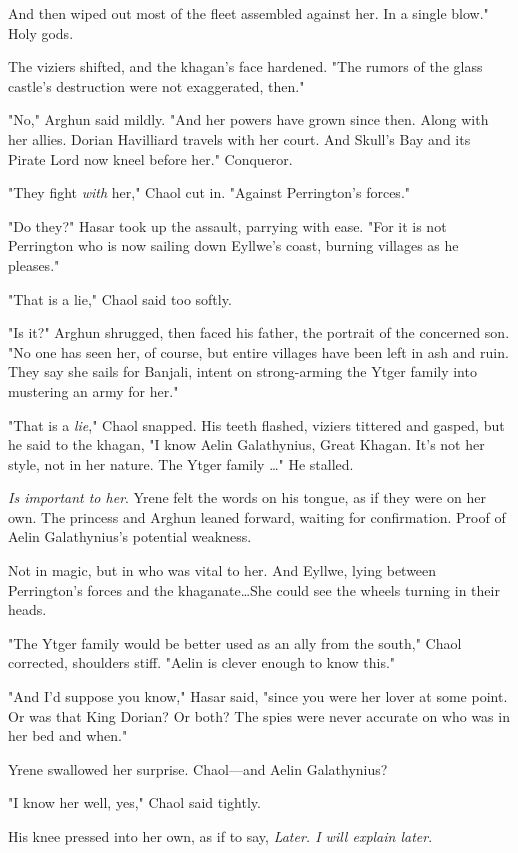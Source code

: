 And then wiped out most of the fleet assembled against her.
In a single blow."
Holy gods.

The viziers shifted, and the khagan's face hardened.
"The rumors of the glass castle's destruction were not exaggerated, then."

"No," Arghun said mildly.
"And her powers have grown since then.
Along with her allies.
Dorian Havilliard travels with her court.
And Skull's Bay and its Pirate Lord now kneel before her."
Conqueror.

"They fight \emph{with} her," Chaol cut in.
"Against Perrington's forces."

"Do they?"
Hasar took up the assault, parrying with ease.
"For it is not Perrington who is now sailing down Eyllwe's coast, burning villages as he pleases."

"That is a lie," Chaol said too softly.

"Is it?"
Arghun shrugged, then faced his father, the portrait of the concerned son.
"No one has seen her, of course, but entire villages have been left in ash and ruin.
They say she sails for Banjali, intent on strong-arming the Ytger family into mustering an army for her."

"That is a \emph{lie}," Chaol snapped.
His teeth flashed, viziers tittered and gasped, but he said to the khagan, "I know Aelin Galathynius, Great Khagan.
It's not her style, not in her nature.
The Ytger family \ldots" He stalled.

\emph{Is important to her}.
Yrene felt the words on his tongue, as if they were on her own.
The princess and Arghun leaned forward, waiting for confirmation.
Proof of Aelin Galathynius's potential weakness.

Not in magic, but in who was vital to her.
And Eyllwe, lying between Perrington's forces and the khaganate\ldots She could see the wheels turning in their heads.

"The Ytger family would be better used as an ally from the south," Chaol corrected, shoulders stiff.
"Aelin is clever enough to know this."

"And I'd suppose you know," Hasar said, "since you were her lover at some point.
Or was that King Dorian?
Or both?
The spies were never accurate on who was in her bed and when."

Yrene swallowed her surprise.
Chaol---and Aelin Galathynius?

"I know her well, yes," Chaol said tightly.

His knee pressed into her own, as if to say, \emph{Later.
I will explain later}.

